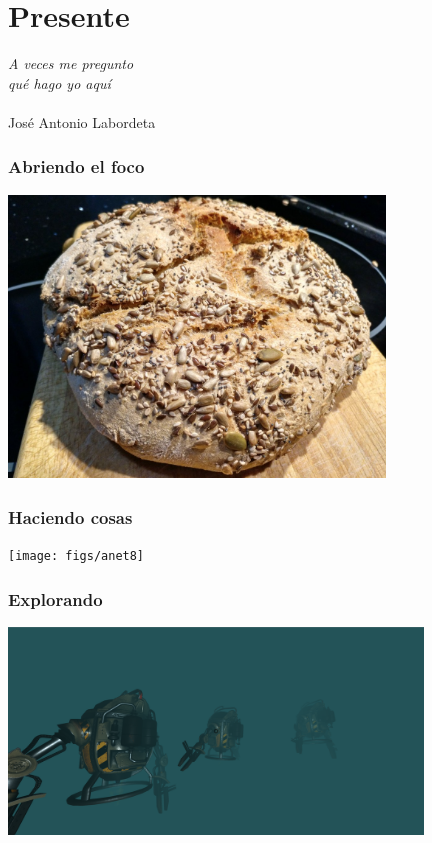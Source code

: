 
\section{Presente}

\begin{flushright}
{\em
  A veces me pregunto \\
  qué hago yo aquí \\
}
~ \\
José Antonio Labordeta \\
\end{flushright}

\begin{frame}[fragile]
  \frametitle{Abriendo el foco}

  \begin{center}
  \includegraphics[width=10cm]{figs/pan}
  \end{center}  
  
\end{frame}

\begin{frame}[fragile]
  \frametitle{Haciendo cosas}

  \begin{center}
  \texttt{[image: figs/anet8]}
  \end{center}  
  
\end{frame}

\begin{frame}[fragile]
  \frametitle{Explorando}

  \begin{center}
  \includegraphics[width=11cm]{figs/aframe-robots}
  \end{center}  
  
\end{frame}

